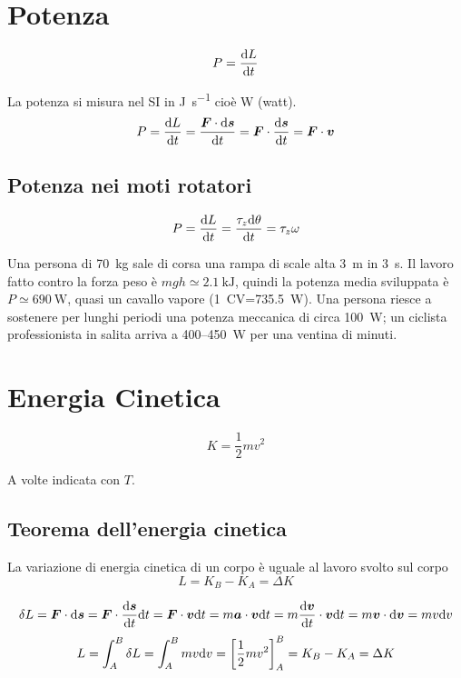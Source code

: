 \section{Potenza}
\begin{Def}[potenza]
  \begin{equation}
    P=\frac{\mathrm{d} L}{\mathrm{d} t}
  \end{equation}
\end{Def}
La potenza si misura nel SI in \si{\joule\per\second} cioè \si{\watt} (watt).
\begin{equation}
  P=\frac{\mathrm{d} L}{\mathrm{d} t}=\frac{\boldsymbol{F}\cdot\mathrm{d} \boldsymbol{s}}{\mathrm{d} t}=\boldsymbol{F}\cdot\frac{\mathrm{d} \boldsymbol{s}}{\mathrm{d}
    t}=\boldsymbol{F}\cdot \boldsymbol{v}
\end{equation}

\subsection{Potenza nei moti rotatori}
\begin{equation}
  P=\frac{\mathrm{d} L}{\mathrm{d} t}=\frac{\tau_z\mathrm{d}\theta}{\mathrm{d}
    t}=\tau_z\omega
\end{equation}

\begin{Es}
  Una persona di \SI{70}{\kilo\gram} sale di corsa una rampa di scale alta \SI{3}{\meter} in \SI{3}{\second}. Il lavoro fatto contro la forza peso è $mgh\simeq\SI{2.1}{\kilo\joule}$, quindi la potenza media sviluppata è $P\simeq\SI{690}{\watt}$, quasi un cavallo vapore (\SI{1}{CV}=\SI{735.5}{\watt}). Una persona riesce a sostenere per lunghi periodi una potenza meccanica di circa \SI{100}{\watt}; un ciclista professionista in salita arriva a 400--\SI{450}{\watt} per una ventina di minuti.
\end{Es}
\section[Energia Cinetica]{Energia Cinetica}
\begin{Def}
  \[K=\frac{1}{2}mv^2\]
\end{Def}
A volte indicata con $T$.
\subsection{Teorema dell'energia cinetica}
\begin{Teo}
  La variazione di energia cinetica di un corpo è uguale al lavoro svolto sul corpo
  \begin{equation}
    L=K_B-K_A=\Delta K
  \end{equation}

\end{Teo}
\[\delta L=\boldsymbol{F}\cdot\mathrm{d} \boldsymbol{s}=\boldsymbol{F}\cdot\frac{\mathrm{d} \boldsymbol{s}}{\mathrm{d} t}\mathrm{d} t=\boldsymbol{F}\cdot\boldsymbol{v}\mathrm{d} t=m\boldsymbol{a}\cdot\boldsymbol{v}\mathrm{d} t=m\frac{\mathrm{d} \boldsymbol{v}}{\mathrm{d} t}\cdot\boldsymbol{v}\mathrm{d} t=m\boldsymbol{v}\cdot\mathrm{d} \boldsymbol{v}=mv\mathrm{d} v\]
\[L = \int_A^B \delta L = \int_A^B mv\mathrm{d} v = \left[\frac{1}{2}m v^2\right]_A^B = K_B - K_A = \Delta K\]

